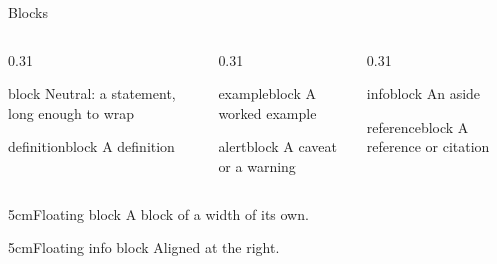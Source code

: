 \begin{standardframe}{Blocks}
	\begin{columns}[t,onlytextwidth]
		\begin{column}{0.31\linewidth}
			\begin{block}{block}
				Neutral: a statement, long enough to wrap
			\end{block}
			\begin{definitionblock}{definitionblock}
				A definition
			\end{definitionblock}
		\end{column}
		\begin{column}{0.31\linewidth}
			\begin{exampleblock}{exampleblock}
				A worked example
			\end{exampleblock}
			\begin{alertblock}{alertblock}
				A caveat or a warning
			\end{alertblock}
		\end{column}
		\begin{column}{0.31\linewidth}
			\begin{infoblock}{infoblock}
				An aside
			\end{infoblock}
			\begin{referenceblock}{referenceblock}
				A reference or citation
			\end{referenceblock}
		\end{column}
	\end{columns}
	\par\smallskip
	\begin{SMFloatingBlock}{5cm}{Floating block}
		A block of a width of its own.
	\end{SMFloatingBlock}
	\hfill
	\begin{SMFloatingInfoBlock}{5cm}{Floating info block}
		Aligned at the right.
	\end{SMFloatingInfoBlock}
\end{standardframe}
